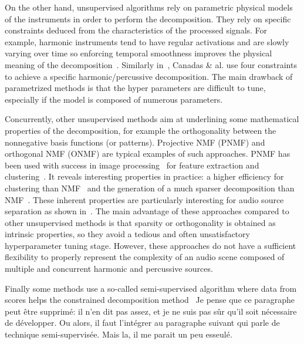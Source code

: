 On the other hand, unsupervised algorithms rely on parametric physical models of the instruments in order to perform the decomposition. They rely on specific constraints deduced from the characteristics of the processed signals. For example, harmonic instruments tend to have regular activations and are slowly varying over time so enforcing temporal smoothness improves the physical meaning of the decomposition~\cite{Virtanen}. Similarly in~\cite{canadas2014percussive}, Canadas \& al. use four constraints to achieve a specific harmonic/percussive decomposition. The main drawback of parametrized methods is that the hyper parameters are difficult to tune, especially if the model is composed of numerous parameters. 

Concurrently, other unsupervised methods aim at underlining some mathematical properties of the decomposition, for example the orthogonality between the nonnegative basis functions (or patterns). Projective NMF (PNMF) and orthogonal NMF (ONMF) are typical examples of such approaches. PNMF has been used with success in image processing~\cite{choi} for feature extraction and clustering~\cite{YangOja10}. It reveals interesting properties in practice: a higher efficiency for clustering than NMF~\cite{choi} and the generation of a much sparser decomposition than NMF~\cite{YangOja10}. These inherent properties are particularly interesting for audio source separation as shown in~\cite{canadas2014percussive,vincent2010adaptive}. 
The main advantage of these approaches compared to other unsupervised methods is that sparsity or orthogonality is obtained as intrinsic properties, so they avoid a tedious and often unsatisfactory hyperparameter tuning stage. However, these approaches do not have a sufficient flexibility to properly represent the complexity of an audio scene composed of multiple and concurrent harmonic and percussive sources.


Finally some methods use a so-called semi-supervised algorithm where data from scores helps the constrained decomposition method~\cite{hennequin2011score,fritsch2013score} {\MK Je pense que ce paragraphe peut être supprimé: il n'en dit pas assez, et je ne suis pas sûr qu'il soit nécessaire de développer. Ou alors, il faut l'intégrer au paragraphe suivant qui parle de technique semi-supervisée. Mais la, il me parait un peu esseul\'e.}


